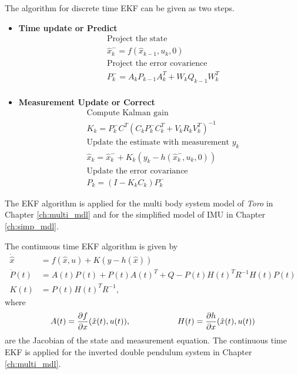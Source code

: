 The algorithm for discrete time EKF can be given as two steps.
\begin{itemize}
    \item \textbf{Time update or Predict}
\begin{equation}
\label{eq:ekf_predict}
\begin{aligned}
&\text{Project the state}\\
&\hat{x}_k^- = f(\hat{x}_{k-1},u_k,0)\\
&\text{Project the error covarience}\\
&P_k^- = A_kP_{k-1}A_k^T + W_kQ_{k-1}W_k^T\\
\end{aligned}
\end{equation}
\item \textbf{Measurement Update or Correct}\\
\begin{equation}
\label{eq:ekf_correct}
\begin{split}
&\text{Compute Kalman gain}\\
&K_k = P_k^-C^T(C_kP_k^-C_k^T + V_kR_kV_k^T)^{-1}\\
&\text{Update the estimate with measurement }y_k\\
&\hat{x}_k = \hat{x}_k^- + K_k(y_k-h(\hat{x}_k^-,u_k,0))\\
&\text{Update the error covariance} \\
&P_k = (I- K_kC_k)P_k^-
\end{split}
\end{equation}
\end{itemize}

The EKF algorithm is applied for the multi body system model of \emph{Toro} in Chapter \ref{ch:multi_mdl} and for the simplified model of IMU in Chapter \ref{ch:simp_mdl}.

The continuous time EKF algorithm is given by \citep{gel74}
\begin{equation}
    \label{eq:ekf_con}
    \begin{split}
        \dot {\hat x} &= f(\hat x,u) + K ( y-h(\hat x))\\
        \dot P(t) &= A(t)P(t) + P(t)A(t)^T + Q - P(t)H(t)^TR^{-1}H(t)P(t)\\
        K(t) &= P(t)H(t)^TR^{-1},
    \end{split}
\end{equation}
where $$A(t) = \frac{\partial {f}}{\partial {x}}(\hat x(t), u(t)), \hspace{2cm} H(t) = \frac{\partial {h}}{\partial {x}} (\hat x(t), u(t))$$ are the Jacobian of the state and measurement equation. The continuous time EKF is applied for the inverted double pendulum system in Chapter \ref{ch:multi_mdl}.

